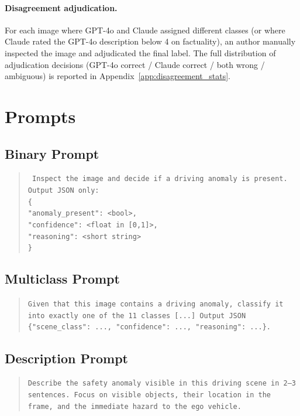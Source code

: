 \documentclass{article}
\begin{document}
\paragraph{Disagreement adjudication.}
For each image where GPT-4o and Claude assigned different classes
(or where Claude rated the GPT-4o description below 4 on factuality),
an author manually inspected the image and adjudicated the final
label. The full distribution of adjudication decisions (GPT-4o
correct / Claude correct / both wrong / ambiguous) is reported in
Appendix~\ref{app:disagreement_stats}.

\section{Prompts}
\label{app:prompts}

\subsection{Binary Prompt}
\begin{quote}\small
\texttt{
Inspect the image and decide if a driving anomaly is present. \\
Output JSON only:\\
\{\\
\hspace*{1em}"anomaly\_present": <bool>,\\
\hspace*{1em}"confidence": <float in [0,1]>,\\
\hspace*{1em}"reasoning": <short string>\\
\}
}
\end{quote}

\subsection{Multiclass Prompt}
\begin{quote}\small
\texttt{Given that this image contains a driving anomaly, classify
it into exactly one of the 11 classes [...] Output JSON
\{"scene\_class": ..., "confidence": ..., "reasoning": ...\}.}
\end{quote}

\subsection{Description Prompt}
\begin{quote}\small
\texttt{Describe the safety anomaly visible in this driving scene in
2--3 sentences. Focus on visible objects, their location in the
frame, and the immediate hazard to the ego vehicle.}
\end{quote}
\end{document}

